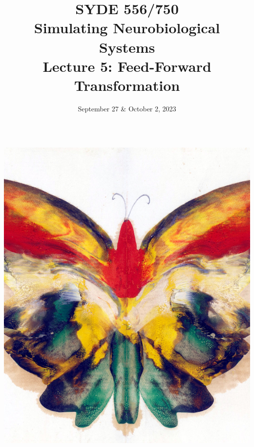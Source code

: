 \documentclass[handout,aspectratio=169]{beamer}
\date{September 27 \& October 2, 2023}
\title{SYDE 556/750 \\ Simulating Neurobiological Systems \\ Lecture 5: Feed-Forward Transformation}
\begin{document}
	
	\begin{frame}{}
		\vspace{0.5cm}
		\begin{columns}[c]
			\MakeTitle
			\includegraphics[width=\textwidth]{media/yellow_butterfly_by_albert_bierstadt_small.jpg}
		\end{columns}
	\end{frame}
\end{document}
